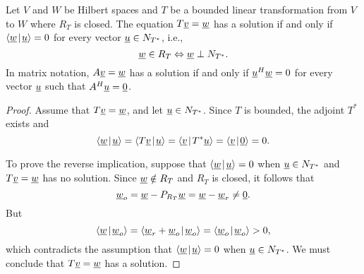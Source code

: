 \begin{theorem}
Let $V$ and $W$ be Hilbert spaces and $T$ be a bounded linear transformation from $V$ to $W$ where $R_T$ is closed.
The equation $T\underline{v} = \underline{w}$ has a solution if and only if ${\left\langle  \underline{w}  \mskip2mu \middle| \mskip2mu  \underline{u}  \right\rangle} = 0$ for every vector $\underline{u} \in N_{T^*}$, i.e.,
\begin{equation*}
\underline{w} \in R_T \Leftrightarrow \underline{w} \perp N_{T^*} .
\end{equation*}
In matrix notation, $A \underline{v} = \underline{w}$ has a solution if and only if $\underline{u}^H \underline{w} = 0$ for every vector $\underline{u}$ such that $A^H \underline{u} = \underline{0}$.
\end{theorem}
\begin{proof}
Assume that $T \underline{v} = \underline{w}$, and let $\underline{u} \in N_{T^*}$.
Since $T$ is bounded, the adjoint $T^*$ exists and
\begin{equation*}
{\left\langle  \underline{w}  \mskip2mu \middle| \mskip2mu  \underline{u}  \right\rangle}
= {\left\langle  T \underline{v}  \mskip2mu \middle| \mskip2mu  \underline{u}  \right\rangle}
= {\left\langle  \underline{v}  \mskip2mu \middle| \mskip2mu  T^* \underline{u}  \right\rangle}
= {\left\langle  \underline{v}  \mskip2mu \middle| \mskip2mu  \underline{0}  \right\rangle}
= 0 .
\end{equation*}

To prove the reverse implication, suppose that ${\left\langle  \underline{w}  \mskip2mu \middle| \mskip2mu  \underline{u}  \right\rangle} = 0$ when $\underline{u} \in N_{T^*}$ and $T \underline{v} = \underline{w}$ has no solution.
Since $\underline{w} \notin R_T$ and $R_T$ is closed, it follows that
\begin{equation*}
\underline{w}_o = \underline{w} - P_{R_T} \underline{w} = \underline{w} - \underline{w}_r
\neq \underline{0}.
\end{equation*}
But
\begin{equation*}
{\left\langle  \underline{w}  \mskip2mu \middle| \mskip2mu  \underline{w}_o  \right\rangle}
= {\left\langle  \underline{w}_r + \underline{w}_o   \mskip2mu \middle| \mskip2mu  \underline{w}_o  \right\rangle}
= {\left\langle  \underline{w}_o  \mskip2mu \middle| \mskip2mu  \underline{w}_o  \right\rangle}
> 0,
\end{equation*}
which contradicts the assumption that ${\left\langle  \underline{w}  \mskip2mu \middle| \mskip2mu  \underline{u}  \right\rangle} = 0$ when $\underline{u} \in N_{T^*}$.
We must conclude that $T \underline{v} = \underline{w}$ has a solution.
\end{proof}


